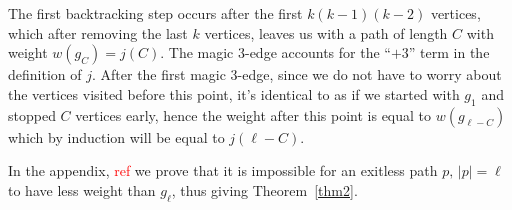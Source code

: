 \documentclass{article}
\theoremstyle{definition}
\newcommand{\hide}[1]{}
\newcommand{\edit}[1]{\textcolor{red}{#1}}
\begin{document}
\vspace{1.75em}
The first backtracking step occurs after the first $k(k-1)(k-2)$ vertices, which after removing the last $k$ vertices, leaves us with a path of length $C$ with weight $w(g_C) = j(C)$. The magic 3-edge accounts for the ``$+3$'' term in the definition of $j$. After the first magic 3-edge, since we do not have to worry about the vertices visited before this point, it's identical to as if we started with $g_1$ and stopped $C$ vertices early, hence the weight after this point is equal to $w(g_{\ell-C})$ which by induction will be equal to $j(\ell-C)$.

\vspace{1.75em}
In the appendix,\edit{ ref} we prove that it is impossible for an exitless path $p,\,|p| = \ell$ to have less weight than $g_\ell$, thus giving Theorem~\ref{thm2}.
\hide{
We may simplify the second case by noting that $j(C) +3 = C +C/k + (C+k)/k(k-1)$. Thus, with $q = \lceil (\ell-k(k-1)(k-2))/C\rceil$, we have
\[
    j(\ell-C) + j(C)+3 = \ell + \left\lceil \frac{\ell}{k}\right\rceil + \left\lceil \frac{\ell+qk}{k(k-1)}\right\rceil -3\]
. We letting $f_2,f_3$ be what is added to the 2nd/3rd term when the ceiling is taken, we have:

\[j(\ell) = \ell\left(1+ \frac{1}{k} + \frac{1}{k(k-1)}\right) + f_2+f_3-3\]}
\end{document}
